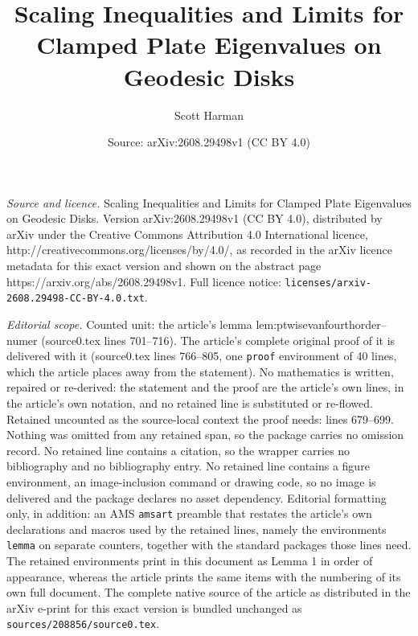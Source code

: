 \documentclass[10pt,a4paper]{amsart}
\title{Scaling Inequalities and Limits for Clamped Plate Eigenvalues on Geodesic Disks}
\author{Scott Harman}
\date{Source: arXiv:2608.29498v1 (CC BY 4.0)}
\begin{document}
\maketitle

\noindent\emph{Source and licence.} Scaling Inequalities and Limits for Clamped Plate Eigenvalues on Geodesic Disks. Version arXiv:2608.29498v1 (CC BY 4.0), distributed by arXiv under the Creative Commons Attribution 4.0 International licence, http://creativecommons.org/licenses/by/4.0/, as recorded in the arXiv licence metadata for this exact version and shown on the abstract page https://arxiv.org/abs/2608.29498v1. Full licence notice: \texttt{licenses/arxiv-2608.29498-CC-BY-4.0.txt}.\par\smallskip

\noindent\textit{Editorial scope.} Counted unit: the article's lemma lem:ptwisevanfourthorder--numer (source0.tex lines 701--716). The article's complete original proof of it is delivered with it (source0.tex lines 766--805, one \texttt{proof} environment of 40 lines, which the article places away from the statement). No mathematics is written, repaired or re-derived: the statement and the proof are the article's own lines, in the article's own notation, and no retained line is substituted or re-flowed.  Retained uncounted as the source-local context the proof needs: lines 679--699.  Nothing was omitted from any retained span, so the package carries no omission record.  No retained line contains a citation, so the wrapper carries no bibliography and no bibliography entry.  No retained line contains a figure environment, an image-inclusion command or drawing code, so no image is delivered and the package declares no asset dependency.  Editorial formatting only, in addition: an AMS \texttt{amsart} preamble that restates the article's own declarations and macros used by the retained lines, namely the environments \texttt{lemma} on separate counters, together with the standard packages those lines need.  The retained environments print in this document as Lemma 1 in order of appearance, whereas the article prints the same items with the numbering of its own full document.  The complete native source of the article as distributed in the arXiv e-print for this exact version is bundled unchanged as \texttt{sources/208856/source0.tex}.
\end{document}
